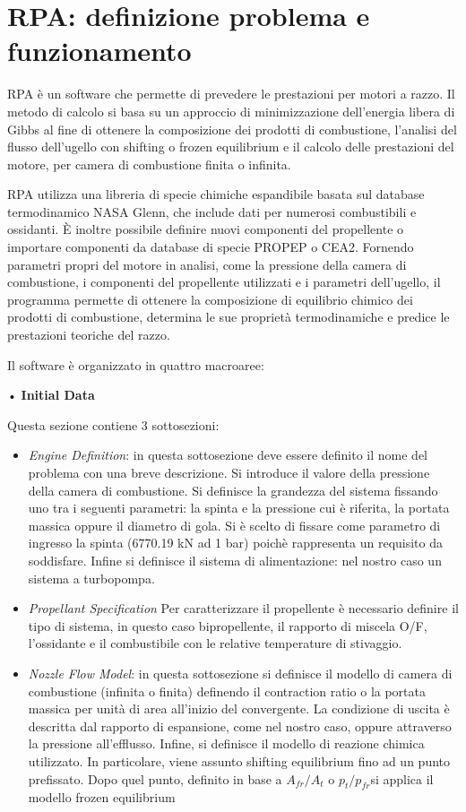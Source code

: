 \section{RPA: definizione problema e funzionamento}
\label{appendix:rpa}

RPA è un software che permette di prevedere le prestazioni per motori a razzo. Il metodo di calcolo si basa su un approccio di minimizzazione dell'energia libera di Gibbs al fine di ottenere la composizione dei prodotti di combustione, l'analisi del flusso dell'ugello con shifting o frozen equilibrium e il calcolo delle prestazioni del motore, per camera di combustione finita o infinita.

RPA utilizza una libreria di specie chimiche espandibile basata sul database termodinamico NASA Glenn, che include dati per numerosi combustibili e ossidanti. È inoltre possibile definire nuovi componenti del propellente o importare componenti da database di specie PROPEP o CEA2.
Fornendo parametri propri del motore in analisi, come la pressione della camera di combustione, i componenti del propellente utilizzati e i parametri dell'ugello, il programma permette di ottenere la composizione di equilibrio chimico dei prodotti di combustione, determina le sue proprietà termodinamiche e predice le prestazioni teoriche del razzo. 

Il software è organizzato in quattro macroaree: 

• \textbf{Initial Data}

Questa sezione contiene 3 sottosezioni:
\begin{itemize}
\item \textit{Engine Definition}: in questa sottosezione deve essere definito il nome del problema con una breve descrizione. Si introduce il valore della pressione della camera di combustione. Si definisce la grandezza del sistema fissando uno tra i seguenti parametri: la spinta e la pressione cui è riferita, la portata massica oppure il diametro di gola. Si è scelto di fissare come parametro di ingresso la spinta (6770.19 kN ad 1 bar) poichè rappresenta un requisito da soddisfare. Infine si definisce il sistema di alimentazione: nel nostro caso un sistema a turbopompa.
\item \textit{Propellant Specification} Per caratterizzare il propellente è necessario definire il tipo di sistema, in questo caso bipropellente, il rapporto di miscela O/F, l'ossidante e il combustibile con le relative temperature di stivaggio. 
\item \textit{Nozzle Flow Model}: in questa sottosezione si definisce il modello di camera di combustione (infinita o finita) definendo il contraction ratio o la portata massica per unità di area all'inizio del convergente. La  condizione di uscita è descritta dal rapporto di espansione, come nel nostro caso, oppure attraverso la pressione all'efflusso. Infine, si definisce il modello di reazione chimica utilizzato. In particolare, viene assunto shifting equilibrium fino ad un punto prefissato. Dopo quel punto, definito in base a $A_{fr}/A_t$ o $p_t/p_{fr}$si applica il modello frozen equilibrium  
\end{itemize}

